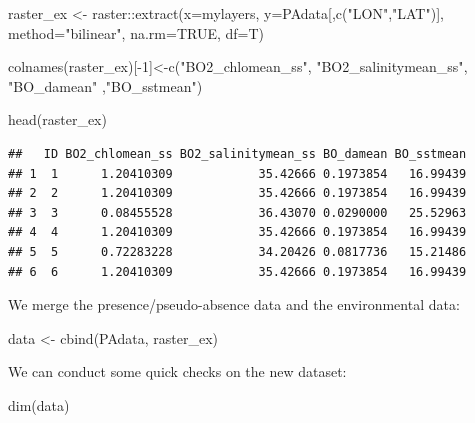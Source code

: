 \documentclass[
]{book}
\newenvironment{Shaded}{\begin{snugshade}}{\end{snugshade}}
\newcommand{\AttributeTok}[1]{\textcolor[rgb]{0.77,0.63,0.00}{#1}}
\newcommand{\ConstantTok}[1]{\textcolor[rgb]{0.00,0.00,0.00}{#1}}
\newcommand{\DecValTok}[1]{\textcolor[rgb]{0.00,0.00,0.81}{#1}}
\newcommand{\FunctionTok}[1]{\textcolor[rgb]{0.00,0.00,0.00}{#1}}
\newcommand{\NormalTok}[1]{#1}
\newcommand{\OtherTok}[1]{\textcolor[rgb]{0.56,0.35,0.01}{#1}}
\newcommand{\SpecialCharTok}[1]{\textcolor[rgb]{0.00,0.00,0.00}{#1}}
\newcommand{\StringTok}[1]{\textcolor[rgb]{0.31,0.60,0.02}{#1}}
\begin{document}
\begin{Shaded}
\begin{Highlighting}[]
\NormalTok{raster\_ex }\OtherTok{\textless{}{-}}\NormalTok{ raster}\SpecialCharTok{::}\FunctionTok{extract}\NormalTok{(}\AttributeTok{x=}\NormalTok{mylayers, }\AttributeTok{y=}\NormalTok{PAdata[,}\FunctionTok{c}\NormalTok{(}\StringTok{"LON"}\NormalTok{,}\StringTok{"LAT"}\NormalTok{)], }\AttributeTok{method=}\StringTok{"bilinear"}\NormalTok{, }\AttributeTok{na.rm=}\ConstantTok{TRUE}\NormalTok{, }\AttributeTok{df=}\NormalTok{T) }

\FunctionTok{colnames}\NormalTok{(raster\_ex)[}\SpecialCharTok{{-}}\DecValTok{1}\NormalTok{]}\OtherTok{\textless{}{-}}\FunctionTok{c}\NormalTok{(}\StringTok{"BO2\_chlomean\_ss"}\NormalTok{, }\StringTok{"BO2\_salinitymean\_ss"}\NormalTok{, }\StringTok{"BO\_damean"}\NormalTok{ ,}\StringTok{"BO\_sstmean"}\NormalTok{)}

\FunctionTok{head}\NormalTok{(raster\_ex)}
\end{Highlighting}
\end{Shaded}

\begin{verbatim}
##   ID BO2_chlomean_ss BO2_salinitymean_ss BO_damean BO_sstmean
## 1  1      1.20410309            35.42666 0.1973854   16.99439
## 2  2      1.20410309            35.42666 0.1973854   16.99439
## 3  3      0.08455528            36.43070 0.0290000   25.52963
## 4  4      1.20410309            35.42666 0.1973854   16.99439
## 5  5      0.72283228            34.20426 0.0817736   15.21486
## 6  6      1.20410309            35.42666 0.1973854   16.99439
\end{verbatim}

We merge the presence/pseudo-absence data and the environmental data:

\begin{Shaded}
\begin{Highlighting}[]
\NormalTok{data }\OtherTok{\textless{}{-}} \FunctionTok{cbind}\NormalTok{(PAdata, raster\_ex)}
\end{Highlighting}
\end{Shaded}

We can conduct some quick checks on the new dataset:

\begin{Shaded}
\begin{Highlighting}[]
\FunctionTok{dim}\NormalTok{(data)}
\end{Highlighting}
\end{Shaded}
\end{document}
